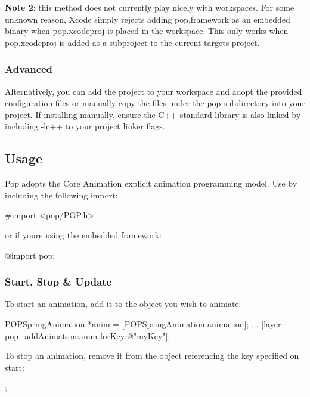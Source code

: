 {\bfseries Note 2}\+: this method does not currently play nicely with workspaces. For some unknown reason, Xcode simply rejects adding pop.\+framework as an embedded binary when pop.\+xcodeproj is placed in the workspace. This only works when pop.\+xcodeproj is added as a subproject to the current target\textquotesingle{}s project.

\subsubsection*{Advanced}

Alternatively, you can add the project to your workspace and adopt the provided configuration files or manually copy the files under the pop subdirectory into your project. If installing manually, ensure the C++ standard library is also linked by including {\ttfamily -\/lc++} to your project linker flags.

\subsection*{Usage}

Pop adopts the Core Animation explicit animation programming model. Use by including the following import\+:


\begin{DoxyCode}
#import <pop/POP.h>
\end{DoxyCode}


or if you\textquotesingle{}re using the embedded framework\+:


\begin{DoxyCode}
@import pop;
\end{DoxyCode}


\subsubsection*{Start, Stop \& Update}

To start an animation, add it to the object you wish to animate\+:


\begin{DoxyCode}
POPSpringAnimation *anim = [POPSpringAnimation animation];
...
[layer pop\_addAnimation:anim forKey:@"myKey"];
\end{DoxyCode}


To stop an animation, remove it from the object referencing the key specified on start\+:


\begin{DoxyCode}
;
\end{DoxyCode}


